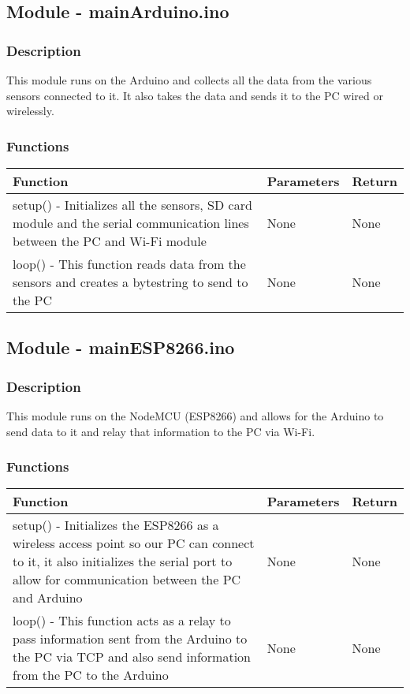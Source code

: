 \documentclass[12pt, titlepage]{article}
\begin{document}
\newpage
    \subsection{Module - mainArduino.ino}

    \subsubsection{Description}
    This module runs on the Arduino and collects all the data from the various sensors connected to it. It also takes the data and sends it to the PC wired or wirelessly.
    

  \subsubsection{Functions}
    \noindent \begin{tabular}{| p{} | p{}| p{}|}
      \hline
      \rowcolor[gray]{0.9}
      Function & Parameters & Return\\
      \hline
      setup() - Initializes all the sensors, SD card module and the serial communication lines between the PC and Wi-Fi module & None & None \\
      \hline
      loop() - This function reads data from the sensors and creates a bytestring to send to the PC & None & None \\
      \hline
      
    \end{tabular}

    \subsection{Module - mainESP8266.ino}

    \subsubsection{Description}
    This module runs on the NodeMCU (ESP8266) and allows for the Arduino to send data to it and relay that information to the PC via Wi-Fi.
    

  \subsubsection{Functions}
    \noindent \begin{tabular}{| p{} | p{}| p{}|}
      \hline
      \rowcolor[gray]{0.9}
      Function & Parameters & Return\\
      \hline
      setup() - Initializes the ESP8266 as a wireless access point so our PC can connect to it, it also initializes the serial port to allow for communication between the PC and Arduino & None & None \\
      \hline
      loop() - This function acts as a relay to pass information sent from the Arduino to the PC via TCP and also send information from the PC to the Arduino & None & None \\
      \hline
      
    \end{tabular}
\end{document}
